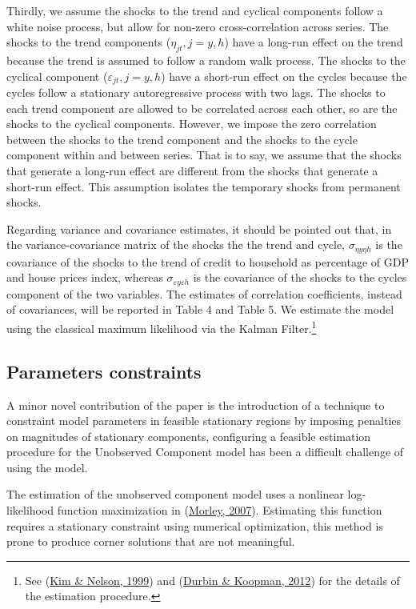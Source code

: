 \documentclass[
  12pt,
]{article}
\begin{document}
Thirdly, we assume the shocks to the trend and cyclical components follow a white noise process, but allow for non-zero cross-correlation across series. The shocks to the trend components (\(\eta_{jt}, j=y,h\)) have a long-run effect on the trend because the trend is assumed to follow a random walk process. The shocks to the cyclical component (\(\varepsilon_{jt}, j=y,h\)) have a short-run effect on the cycles because the cycles follow a stationary autoregressive process with two lags. The shocks to each trend component are allowed to be correlated across each other, so are the shocks to the cyclical components. However, we impose the zero correlation between the shocks to the trend component and the shocks to the cycle component within and between series. That is to say, we assume that the shocks that generate a long-run effect are different from the shocks that generate a short-run effect. This assumption isolates the temporary shocks from permanent shocks.

Regarding variance and covariance estimates, it should be pointed out that, in the variance-covariance matrix of the shocks the the trend and cycle, \(\sigma_{\eta y \eta h}\) is the covariance of the shocks to the trend of credit to household as percentage of GDP and house prices index, whereas \(\sigma_{\varepsilon y \varepsilon h}\) is the covariance of the shocks to the cycles component of the two variables. The estimates of correlation coefficients, instead of covariances, will be reported in Table 4 and Table 5. We estimate the model using the classical maximum likelihood via the Kalman Filter.\footnote{See (\protect\hyperlink{ref-kim_state-space_1999}{Kim \& Nelson, 1999}) and (\protect\hyperlink{ref-durbin_time_2012}{Durbin \& Koopman, 2012}) for the details of the estimation procedure.}

\hypertarget{parameters-constraints}{%
\subsection{Parameters constraints}\label{parameters-constraints}}

A minor novel contribution of the paper is the introduction of a technique to constraint model parameters in feasible stationary regions by imposing penalties on magnitudes of stationary components, configuring a feasible estimation procedure for the Unobserved Component model has been a difficult challenge of using the model.

The estimation of the unobserved component model uses a nonlinear log-likelihood function maximization in (\protect\hyperlink{ref-morley_slow_2007}{Morley, 2007}). Estimating this function requires a stationary constraint using numerical optimization, this method is prone to produce corner solutions that are not meaningful.
\end{document}
